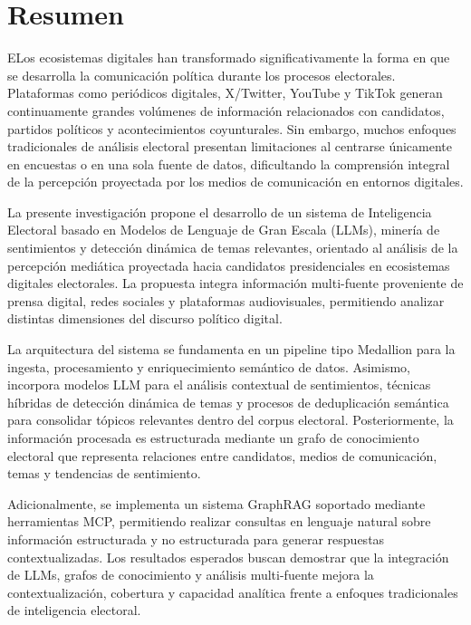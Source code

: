 
\chapter*{Resumen}

ELos ecosistemas digitales han transformado significativamente la forma en que se desarrolla la comunicación política durante los procesos electorales. Plataformas como periódicos digitales, X/Twitter, YouTube y TikTok generan continuamente grandes volúmenes de información relacionados con candidatos, partidos políticos y acontecimientos coyunturales. Sin embargo, muchos enfoques tradicionales de análisis electoral presentan limitaciones al centrarse únicamente en encuestas o en una sola fuente de datos, dificultando la comprensión integral de la percepción proyectada por los medios de comunicación en entornos digitales.

La presente investigación propone el desarrollo de un sistema de Inteligencia Electoral basado en Modelos de Lenguaje de Gran Escala (LLMs), minería de sentimientos y detección dinámica de temas relevantes, orientado al análisis de la percepción mediática proyectada hacia candidatos presidenciales en ecosistemas digitales electorales. La propuesta integra información multi-fuente proveniente de prensa digital, redes sociales y plataformas audiovisuales, permitiendo analizar distintas dimensiones del discurso político digital.

La arquitectura del sistema se fundamenta en un pipeline tipo Medallion para la ingesta, procesamiento y enriquecimiento semántico de datos. Asimismo, incorpora modelos LLM para el análisis contextual de sentimientos, técnicas híbridas de detección dinámica de temas y procesos de deduplicación semántica para consolidar tópicos relevantes dentro del corpus electoral. Posteriormente, la información procesada es estructurada mediante un grafo de conocimiento electoral que representa relaciones entre candidatos, medios de comunicación, temas y tendencias de sentimiento.

Adicionalmente, se implementa un sistema GraphRAG soportado mediante herramientas MCP, permitiendo realizar consultas en lenguaje natural sobre información estructurada y no estructurada para generar respuestas contextualizadas. Los resultados esperados buscan demostrar que la integración de LLMs, grafos de conocimiento y análisis multi-fuente mejora la contextualización, cobertura y capacidad analítica frente a enfoques tradicionales de inteligencia electoral.

